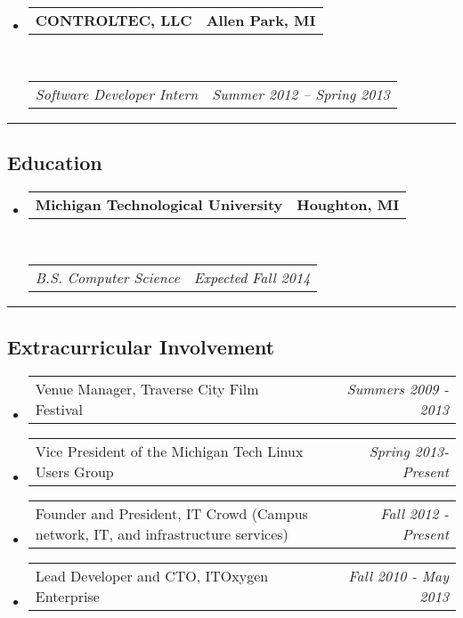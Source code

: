\documentclass[12pt,letterpaper]{article}
\makeatletter
\newcommand{\headerrow}[2]
{\begin{tabular*}{\linewidth}{l@{\extracolsep{\fill}}r}
        #1 &
        #2 \\
\end{tabular*}}
\makeatother
\begin{document}
\begin{itemize}
        \item
        \headerrow
                {\textbf{CONTROLTEC, LLC}}
                {\textbf{Allen Park, MI}}
        \\
        \headerrow
                {\emph{Software Developer Intern}}
                {\emph{Summer 2012 -- Spring 2013}}

\end{itemize}

\hrule
\vspace{-0.4em}
\subsection*{Education}

\begin{itemize}
        \parskip=0.1em

        \item
        \headerrow
                {\textbf{Michigan Technological University}}
                {\textbf{Houghton, MI}}
        \\
        \headerrow
                {\emph{B.S. Computer Science}}
                {\emph{Expected Fall 2014}}

\end{itemize}

\hrule
\vspace{-0.4em}
\subsection*{Extracurricular Involvement}

\begin{itemize}
        \parskip=0.1em

        \item
        \headerrow
                {Venue Manager, Traverse City Film Festival}
                {\emph{Summers 2009 - 2013}}

        \item
        \headerrow
                {Vice President of the Michigan Tech Linux Users Group}
                {\emph{Spring 2013-Present}}

        \item
        \headerrow
                {Founder and President, IT Crowd (Campus network, IT, and infrastructure services)}
                {\emph{Fall 2012 - Present}}
        \item
        \headerrow
                {Lead Developer and CTO, ITOxygen Enterprise}
                {\emph{Fall 2010 - May 2013}}

\end{itemize}
\end{document}
